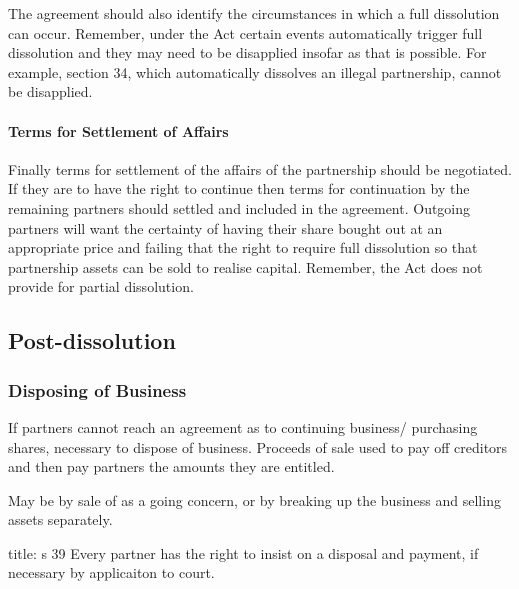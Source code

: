\documentclass[
]{article}
\newenvironment{Shaded}{}{}
\newcommand{\NormalTok}[1]{#1}
\begin{document}
The agreement should also identify the circumstances in which a full
dissolution can occur. Remember, under the Act certain events
automatically trigger full dissolution and they may need to be
disapplied insofar as that is possible. For example, section 34, which
automatically dissolves an illegal partnership, cannot be disapplied.

\hypertarget{terms-for-settlement-of-affairs}{%
\paragraph{Terms for Settlement of
Affairs}\label{terms-for-settlement-of-affairs}}

Finally terms for settlement of the affairs of the partnership should be
negotiated. If they are to have the right to continue then terms for
continuation by the remaining partners should settled and included in
the agreement. Outgoing partners will want the certainty of having their
share bought out at an appropriate price and failing that the right to
require full dissolution so that partnership assets can be sold to
realise capital. Remember, the Act does not provide for partial
dissolution.

\hypertarget{post-dissolution}{%
\subsection{Post-dissolution}\label{post-dissolution}}

\hypertarget{disposing-of-business}{%
\subsubsection{Disposing of Business}\label{disposing-of-business}}

If partners cannot reach an agreement as to continuing business/
purchasing shares, necessary to dispose of business. Proceeds of sale
used to pay off creditors and then pay partners the amounts they are
entitled.

May be by sale of as a going concern, or by breaking up the business and
selling assets separately.

\begin{Shaded}
\begin{Highlighting}[]
\NormalTok{title: s 39}
\NormalTok{Every partner has the right to insist on a disposal and payment, if necessary by applicaiton to court. }
\end{Highlighting}
\end{Shaded}
\end{document}

